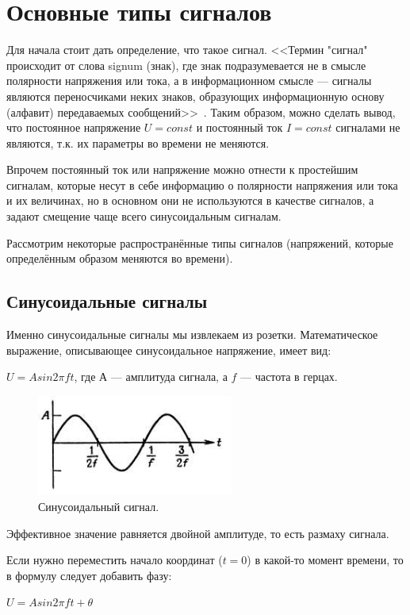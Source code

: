 \section{Основные типы сигналов}
Для начала стоит дать определение, что такое сигнал. <<Термин "сигнал" происходит от слова signum (знак), где знак подразумевается не в смысле полярности напряжения или тока, а в информационном смысле — сигналы являются переносчиками неких знаков, образующих информационную основу (алфавит) передаваемых сообщений>>~\cite{dgs}. Таким образом, можно сделать вывод, что постоянное напряжение $U=const$ и постоянный ток $I=const$ сигналами не являются, т.к. их параметры во времени не меняются.

Впрочем постоянный ток или напряжение можно отнести к простейшим сигналам, которые несут в себе информацию о полярности напряжения или тока и их величинах, но в основном они не используются в качестве сигналов, а задают смещение чаще всего синусоидальным сигналам.

Рассмотрим некоторые распространённые типы сигналов (напряжений, которые определённым образом меняются во времени).
\subsection{Синусоидальные сигналы}
Именно синусоидальные сигналы мы извлекаем из розетки. Математическое выражение, описывающее синусоидальное напряжение, имеет вид:

$U=A sin2 \pi ft$, где $А$ --- амплитуда сигнала, а $f$ --- частота в герцах.

	\begin{figure}[H]
    \centering
    \includegraphics[width=0.575\textwidth]{../image/s_sin.png}
    \caption{Синусоидальный сигнал.}
	\end{figure}
Эффективное значение равняется двойной амплитуде, то есть размаху сигнала. 

Если нужно переместить начало координат ($t=0$) в какой-то момент времени, то в формулу следует добавить фазу:

$U=A sin2 \pi ft + \theta$

